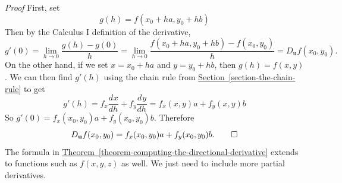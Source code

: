 \documentclass[10pt,]{book}
\makeatletter
\theoremstyle{ptxplainnotitle}
\theoremstyle{ptxplaintitle}
\theoremstyle{ptxplainnotitle}
\theoremstyle{ptxplaintitle}
\theoremstyle{ptxplainnotitle}
\theoremstyle{ptxplaintitle}
\renewcommand*{\proofname}{Proof}
\renewenvironment{proof}[1][\proofname]{\par
  \pushQED{\qed}%
  \normalfont \topsep6\p@\@plus6\p@\relax
  \trivlist
  \item\relax
    {\itshape
    #1\@addpunct{.}}\hspace\labelsep\ignorespaces
}{%
  \popQED\endtrivlist\@endpefalse
}
\theoremstyle{ptxdefinitionnotitle}
\theoremstyle{ptxdefinitiontitle}
\theoremstyle{ptxdefinitionnotitle}
\theoremstyle{ptxdefinitiontitle}
\theoremstyle{ptxdefinitionnotitle}
\theoremstyle{ptxdefinitiontitle}
\theoremstyle{ptxdefinitionnotitle}
\theoremstyle{ptxdefinitiontitle}
\theoremstyle{ptxdefinitionnotitle}
\theoremstyle{ptxdefinitiontitle}
\numberwithin{equation}{section}
\newcommand{\vv}[1]{\mathbf{#1}}
\newcommand{\dv}[3][]{\dfrac{d^{#1} #2}{d #3^{#1}}}
\makeatother
\begin{document}
\begin{proof}\hypertarget{proof-14}{}
\hypertarget{p-1057}{}%
First, set%
\begin{equation*}
g(h) = f(x_{0}+ha, y_{0} +hb)
\end{equation*}
Then by the Calculus I definition of the derivative,%
\begin{equation*}
g'(0) = \lim_{h\to0}\frac{g(h) - g(0)}{h} = \lim_{h\to0}\frac{f(x_{0}+ha, y_{0}+hb) - f(x_{0},y_{0})}{h} = D_{\vv{u}}f(x_{0},y_{0}).
\end{equation*}
On the other hand, if we set \(x = x_{0} + ha\) and \(y = y_{0} + hb\), then \(g(h) = f(x,y)\). We can then find \(g'(h)\) using the chain rule from \hyperref[section-the-chain-rule]{Section~\ref{section-the-chain-rule}} to get%
\begin{equation*}
g'(h) = f_{x}\dv{x}{h} + f_{y}\dv{y}{h} = f_{x}(x,y)a + f_{y}(x,y)b
\end{equation*}
So \(g'(0) = f_{x}(x_{0},y_{0})a + f_{y}(x_{0},y_{0})b.\) Therefore%
\begin{equation*}
D_{\vv{u}}f(x_{0},y_{0}) = f_{x}(x_{0},y_{0})a + f_{y}(x_{0},y_{0})b.\qedhere
\end{equation*}
%
\end{proof}
\hypertarget{p-1058}{}%
The formula in \hyperref[theorem-computing-the-directional-derivative]{Theorem~\ref{theorem-computing-the-directional-derivative}} extends to functions such as \(f(x,y,z)\) as well. We just need to include more partial derivatives.%
\end{document}
